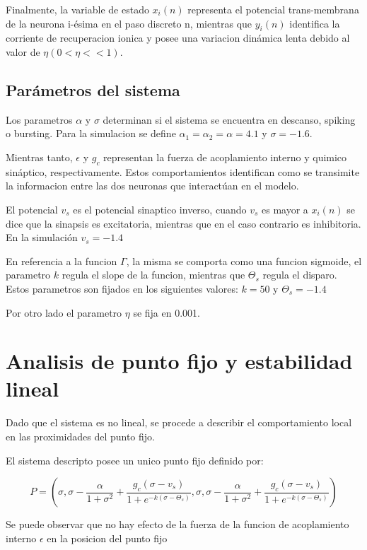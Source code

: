 \documentclass[12pt]{article}
\begin{document}
Finalmente, la variable de estado $x_{i}(n)$ representa el potencial trans-membrana de la neurona i-ésima en el paso discreto n, mientras que $y_{i}(n)$ identifica la corriente de recuperacion ionica y posee una variacion dinámica lenta debido al valor de $\eta (0 < \eta << 1)$.

\subsection{Parámetros del sistema}
Los parametros $\alpha$ y $\sigma$ determinan si el sistema se encuentra en descanso, spiking o bursting. Para la simulacion se define $\alpha_{1}=\alpha_{2}=\alpha=4.1$ y $\sigma=-1.6$. 

Mientras tanto, $\epsilon$ y $g_{c}$ representan la fuerza de acoplamiento interno y quimico sináptico, respectivamente. Estos comportamientos identifican como se transimite la informacion entre las dos neuronas que interactúan en el modelo.

El potencial $v_{s}$ es el potencial sinaptico inverso, cuando $v_{s}$ es mayor a $x_{i}(n)$ se dice que la sinapsis es excitatoria, mientras que en el caso contrario es inhibitoria. En la simulación $v_{s}=-1.4$

En referencia a la funcion $\Gamma$, la misma se comporta como una funcion sigmoide, el parametro $k$ regula el slope de la funcion, mientras que $\Theta_{s}$ regula el disparo. Estos parametros son fijados en los siguientes valores: $k=50$ y $\Theta_{s}=-1.4$

Por otro lado el parametro $\eta$ se fija en 0.001.

\section{Analisis de punto fijo y estabilidad lineal}
Dado que el sistema es no lineal, se procede a describir el comportamiento local en las proximidades del punto fijo.

El sistema descripto posee un unico punto fijo definido por: 

\begin{equation}
    P = (\sigma, \sigma - \frac{\alpha}{1+\sigma^{2}} + \frac{g_{c}(\sigma-v_{s})}{1+e^{-k(\sigma-\Theta_{s})}}, \sigma, \sigma - \frac{\alpha}{1+\sigma^{2}} + \frac{g_{c}(\sigma-v_{s})}{1+e^{-k(\sigma-\Theta_{s})}})
\end{equation}

Se puede observar que no hay efecto de la fuerza de la funcion de acoplamiento interno $\epsilon$ en la posicion del punto fijo

\medskip

\printbibliography
\end{document}
